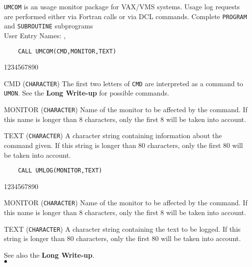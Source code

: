                     
             
\Submitter{}                      
{\tt UMCOM} is an usage monitor package for VAX/VMS systems. Usage
log requests are performed either via Fortran calls or via
DCL commands.
\Structure
Complete {\tt PROGRAM} and {\tt SUBROUTINE} subprograms \\
User Entry Names: , 
\Usage
\begin{verbatim}
    CALL UMCOM(CMD,MONITOR,TEXT)
\end{verbatim}
\begin{DLtt}{1234567890}
\item [CMD] ({\tt CHARACTER}) The first two letters of {\tt CMD} are
interpreted as a command to {\tt UMON}. See the {\bf Long Write-up} for
possible commands.
\item [MONITOR] ({\tt CHARACTER}) Name of the monitor to be affected by
the command. If this name is longer than 8 characters, only the
first 8 will be taken into account.
\item [TEXT] ({\tt CHARACTER}) A character string containing information
about the command given. If this string is longer than 80 characters,
only the first 80 will be taken into account.
\end{DLtt}
\begin{verbatim}
    CALL UMLOG(MONITOR,TEXT)
\end{verbatim}
\begin{DLtt}{1234567890}
\item [MONITOR] ({\tt CHARACTER}) Name of the monitor to be affected by
the command. If this name is longer than 8 characters, only the
first 8 will be taken into account.
\item [TEXT] ({\tt CHARACTER}) A character string containing the text
to be logged. If this string is longer than 80 characters, only the
first 80 will be taken into account.
\end{DLtt}
See also the {\bf Long Write-up}.
\\ $\bullet$
